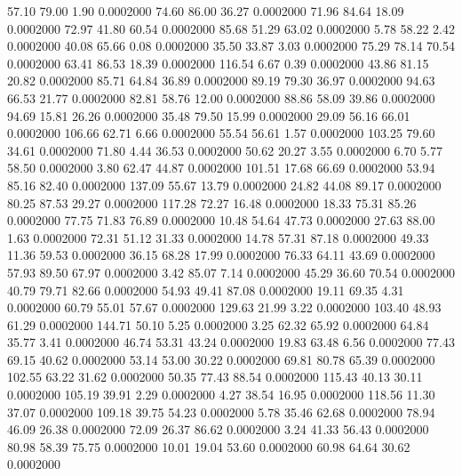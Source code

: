  57.10   79.00    1.90   0.0002000
  74.60   86.00   36.27   0.0002000
  71.96   84.64   18.09   0.0002000
  72.97   41.80   60.54   0.0002000
  85.68   51.29   63.02   0.0002000
   5.78   58.22    2.42   0.0002000
  40.08   65.66    0.08   0.0002000
  35.50   33.87    3.03   0.0002000
  75.29   78.14   70.54   0.0002000
  63.41   86.53   18.39   0.0002000
 116.54    6.67    0.39   0.0002000
  43.86   81.15   20.82   0.0002000
  85.71   64.84   36.89   0.0002000
  89.19   79.30   36.97   0.0002000
  94.63   66.53   21.77   0.0002000
  82.81   58.76   12.00   0.0002000
  88.86   58.09   39.86   0.0002000
  94.69   15.81   26.26   0.0002000
  35.48   79.50   15.99   0.0002000
  29.09   56.16   66.01   0.0002000
 106.66   62.71    6.66   0.0002000
  55.54   56.61    1.57   0.0002000
 103.25   79.60   34.61   0.0002000
  71.80    4.44   36.53   0.0002000
  50.62   20.27    3.55   0.0002000
   6.70    5.77   58.50   0.0002000
   3.80   62.47   44.87   0.0002000
 101.51   17.68   66.69   0.0002000
  53.94   85.16   82.40   0.0002000
 137.09   55.67   13.79   0.0002000
  24.82   44.08   89.17   0.0002000
  80.25   87.53   29.27   0.0002000
 117.28   72.27   16.48   0.0002000
  18.33   75.31   85.26   0.0002000
  77.75   71.83   76.89   0.0002000
  10.48   54.64   47.73   0.0002000
  27.63   88.00    1.63   0.0002000
  72.31   51.12   31.33   0.0002000
  14.78   57.31   87.18   0.0002000
  49.33   11.36   59.53   0.0002000
  36.15   68.28   17.99   0.0002000
  76.33   64.11   43.69   0.0002000
  57.93   89.50   67.97   0.0002000
   3.42   85.07    7.14   0.0002000
  45.29   36.60   70.54   0.0002000
  40.79   79.71   82.66   0.0002000
  54.93   49.41   87.08   0.0002000
  19.11   69.35    4.31   0.0002000
  60.79   55.01   57.67   0.0002000
 129.63   21.99    3.22   0.0002000
 103.40   48.93   61.29   0.0002000
 144.71   50.10    5.25   0.0002000
   3.25   62.32   65.92   0.0002000
  64.84   35.77    3.41   0.0002000
  46.74   53.31   43.24   0.0002000
  19.83   63.48    6.56   0.0002000
  77.43   69.15   40.62   0.0002000
  53.14   53.00   30.22   0.0002000
  69.81   80.78   65.39   0.0002000
 102.55   63.22   31.62   0.0002000
  50.35   77.43   88.54   0.0002000
 115.43   40.13   30.11   0.0002000
 105.19   39.91    2.29   0.0002000
   4.27   38.54   16.95   0.0002000
 118.56   11.30   37.07   0.0002000
 109.18   39.75   54.23   0.0002000
   5.78   35.46   62.68   0.0002000
  78.94   46.09   26.38   0.0002000
  72.09   26.37   86.62   0.0002000
   3.24   41.33   56.43   0.0002000
  80.98   58.39   75.75   0.0002000
  10.01   19.04   53.60   0.0002000
  60.98   64.64   30.62   0.0002000
